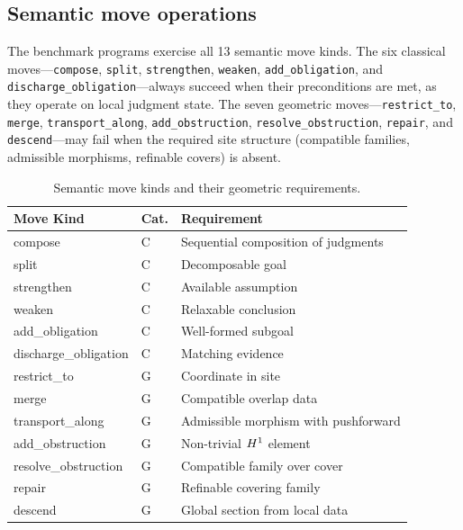 \documentclass[11pt]{article}
\begin{document}
\subsection{Semantic move operations}\label{sec:eval-moves}

The \compTotalPrograms{} benchmark programs exercise all 13 semantic
move kinds.  The six classical moves---\texttt{compose},
\texttt{split}, \texttt{strengthen}, \texttt{weaken},
\texttt{add\_obligation}, and \texttt{discharge\_obligation}---always
succeed when their preconditions are met, as they operate on
local judgment state.  The seven geometric moves---\texttt{restrict\_to},
\texttt{merge}, \texttt{transport\_along}, \texttt{add\_obstruction},
\texttt{resolve\_obstruction}, \texttt{repair}, and
\texttt{descend}---may fail when the required site structure
(compatible families, admissible morphisms, refinable covers)
is absent.

\begin{table}[t]
\centering
\caption{Semantic move kinds and their geometric requirements.}
\label{tab:move-composition}
\begin{tabular}{@{}llp{6.5cm}@{}}
\toprule
\textbf{Move Kind} & \textbf{Cat.} & \textbf{Requirement} \\
\midrule
compose               & C & Sequential composition of judgments \\
split                 & C & Decomposable goal \\
strengthen            & C & Available assumption \\
weaken                & C & Relaxable conclusion \\
add\_obligation       & C & Well-formed subgoal \\
discharge\_obligation & C & Matching evidence \\
\midrule
restrict\_to          & G & Coordinate in site \\
merge                 & G & Compatible overlap data \\
transport\_along      & G & Admissible morphism with pushforward \\
add\_obstruction      & G & Non-trivial $H^{1}$ element \\
resolve\_obstruction  & G & Compatible family over cover \\
repair                & G & Refinable covering family \\
descend               & G & Global section from local data \\
\bottomrule
\end{tabular}
\end{table}
\end{document}

